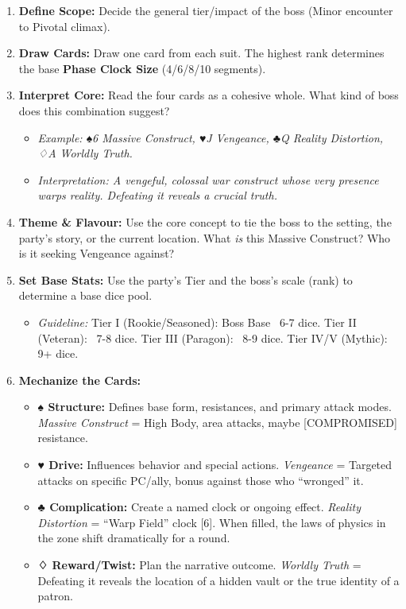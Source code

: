 \begin{enumerate}
    \item \textbf{Define Scope:} Decide the general tier/impact of the boss (Minor encounter to Pivotal climax).
    \item \textbf{Draw Cards:} Draw one card from each suit. The highest rank determines the base \textbf{Phase Clock Size} (4/6/8/10 segments).
    \item \textbf{Interpret Core:} Read the four cards as a cohesive whole. What kind of boss does this combination suggest?
    \begin{itemize}
        \item \emph{Example: ♠6 Massive Construct, ♥J Vengeance, ♣Q Reality Distortion, ♢A Worldly Truth.}
        \item \emph{Interpretation: A vengeful, colossal war construct whose very presence warps reality. Defeating it reveals a crucial truth.}
    \end{itemize}
    \item \textbf{Theme \& Flavour:} Use the core concept to tie the boss to the setting, the party's story, or the current location. What \emph{is} this Massive Construct? Who is it seeking Vengeance against?
    \item \textbf{Set Base Stats:} Use the party's Tier and the boss's scale (rank) to determine a base dice pool.
    \begin{itemize}
        \item \emph{Guideline:} Tier I (Rookie/Seasoned): Boss Base ~6-7 dice. Tier II (Veteran): ~7-8 dice. Tier III (Paragon): ~8-9 dice. Tier IV/V (Mythic): 9+ dice.
    \end{itemize}
    \item \textbf{Mechanize the Cards:}
    \begin{itemize}
        \item \textbf{♠ Structure:} Defines base form, resistances, and primary attack modes. \emph{Massive Construct} = High Body, area attacks, maybe [COMPROMISED] resistance.
        \item \textbf{♥ Drive:} Influences behavior and special actions. \emph{Vengeance} = Targeted attacks on specific PC/ally, bonus against those who ``wronged'' it.
        \item \textbf{♣ Complication:} Create a named clock or ongoing effect. \emph{Reality Distortion} = ``Warp Field'' clock [6]. When filled, the laws of physics in the zone shift dramatically for a round.
        \item \textbf{♢ Reward/Twist:} Plan the narrative outcome. \emph{Worldly Truth} = Defeating it reveals the location of a hidden vault or the true identity of a patron.

\end{itemize}
\end{enumerate}
